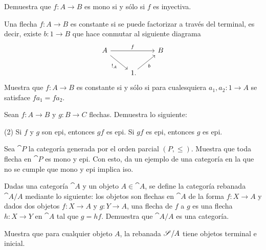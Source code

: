 \begin{exercise}[teca=1]
  Demuestra que \(f\colon A\to B\) es mono si y sólo si \(f\) es 
  inyectiva.
\end{exercise}

\begin{exercise}
  Una flecha \(f\colon A\to B\) es constante si se puede factorizar a
  través del terminal, es decir, existe \(b\colon 1\to B\) que hace
  conmutar al siguiente diagrama
  \begin{equation*}
      \begin{tikzcd}[ampersand replacement=\&] 
          A\ar{rr}{f}\ar{dr}[swap]{!_A} \&\& B\\
          \& 1\mathrlap{.}\ar{ur}[swap]{b}
      \end{tikzcd}
  \end{equation*}
  Muestra que \(f\colon A\to B\) es constante si y sólo si para
  cualesquiera \(a_1,a_2\colon 1\to A\) se satisface \(fa_1 = fa_2\).
\end{exercise}

\begin{exercise}
  Sean \(f\colon A\to B\) y \(g\colon B\to C\) flechas. Demuestra lo
  siguiente:
  \begin{tasks}(2)
      \task Si \(f\) y \(g\) son epi, entonces \(gf\) es epi.
      \task Si \(gf\) es epi, entonces \(g\) es epi.
  \end{tasks}
\end{exercise}

\begin{exercise}
  Sea \(\cat{P}\) la categoría generada por el orden parcial \((P,\leq)\).
  Muestra que toda flecha en \(\cat{P}\) es mono y epi. Con esto, da un
  ejemplo de una categoría en la que no se cumple que mono y epi implica iso.
\end{exercise}

\begin{exercise}
  Dadas una categoría \(\cat{A}\) y un objeto \(A\in\cat{A}\), se define
  la categoría rebanada  \(\cat{A}/A\) mediante lo siguiente: los objetos
  son flechas en \(\cat{A}\) de la forma \(f\colon X\to A\) y dados
  dos objetos \(f\colon X\to A\) y \(g\colon Y\to A\), una flecha de
  \(f\) a \(g\) es una flecha \(h\colon X\to Y\) en \(\cat{A}\) tal que
  \(g = hf\). Demuestra que \(\cat{A}/A\) es una categoría.
\end{exercise}

\begin{exercise}
  Muestra que para cualquier objeto \(A\), la rebanada \(\mathscr{S}/A\)
  tiene objetos terminal e inicial.
\end{exercise}

